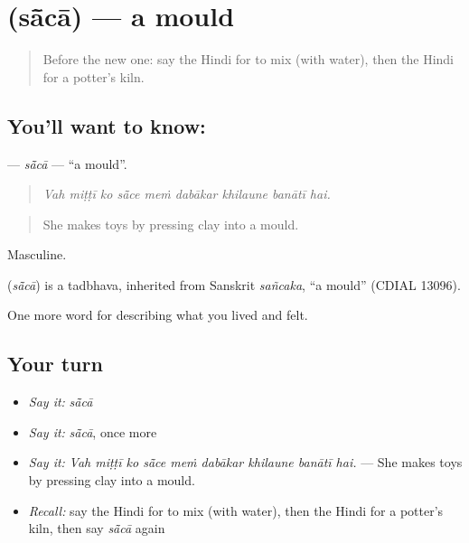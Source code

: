 \section[\texorpdfstring{\hi{साँचा} (sā̃cā)}{साँचा (sā̃cā)}]{ (sā̃cā) — a mould}

\label{lesson:HI-C511-saca}



\begin{quote}
Before the new one: say the Hindi for to mix (with water), then the Hindi for a potter's kiln.
\end{quote}

\subsection*{You'll want to know: }
\textbf{} — \emph{sā̃cā} — \textquotedblleft{}a mould\textquotedblright{}.

\begin{quote}
        
\end{quote}

\begin{quote}
\emph{Vah miṭṭī ko sā̃ce meṁ dabākar khilaune banātī hai.}
\end{quote}

\begin{quote}
She makes toys by pressing clay into a mould.
\end{quote}

Masculine.

\begin{cousinweb}
\textbf{} (\emph{sā̃cā}) is a tadbhava, inherited from Sanskrit \emph{sañcaka}, \textquotedblleft{}a mould\textquotedblright{} (CDIAL 13096).
\end{cousinweb}

\begin{grammarlens}[title={What you've built}]
One more word for describing what you lived and felt.
\end{grammarlens}

\subsection*{Your turn}
\begin{itemize}
\raggedright
  \item \emph{Say it:} \emph{sā̃cā}
  \item \emph{Say it:} \emph{sā̃cā}, once more
  \item \emph{Say it:} \emph{Vah miṭṭī ko sā̃ce meṁ dabākar khilaune banātī hai.} — She makes toys by pressing clay into a mould.
  \item \emph{Recall:} say the Hindi for to mix (with water), then the Hindi for a potter's kiln, then say \emph{sā̃cā} again
\end{itemize}

